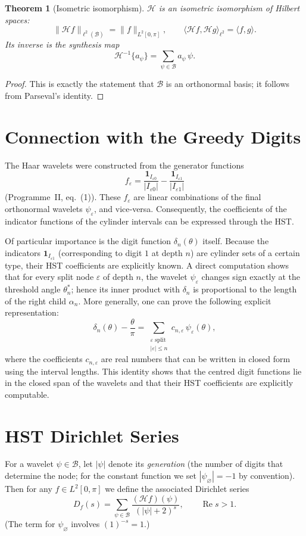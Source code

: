 \documentclass[11pt,a4paper]{article}
\newtheorem{theorem}{Theorem}[section]
\begin{document}
\begin{theorem}[Isometric isomorphism]\label{thm:isometry}
\(\mathcal{H}\) is an isometric isomorphism of Hilbert spaces:
\[
\|\mathcal{H}f\|_{\ell^2(\mathcal{B})} = \|f\|_{L^2[0,\pi]},\qquad
\langle \mathcal{H}f,\mathcal{H}g\rangle_{\ell^2} = \langle f,g\rangle .
\]
Its inverse is the synthesis map
\[
\mathcal{H}^{-1}\{a_\psi\} = \sum_{\psi\in\mathcal{B}} a_\psi\,\psi .
\]
\end{theorem}
\begin{proof}
This is exactly the statement that \(\mathcal{B}\) is an orthonormal basis; it follows from Parseval’s identity.
\end{proof}

\section{Connection with the Greedy Digits}
The Haar wavelets were constructed from the generator functions
\[
f_\varepsilon = \frac{\mathbf{1}_{I_{\varepsilon0}}}{|I_{\varepsilon0}|} - \frac{\mathbf{1}_{I_{\varepsilon1}}}{|I_{\varepsilon1}|}
\]
(Programme~II, eq.~(1)).  These \(f_\varepsilon\) are linear combinations of the final orthonormal wavelets \(\psi_\varepsilon\), and vice‑versa.  Consequently, the coefficients of the indicator functions of the cylinder intervals can be expressed through the HST.

Of particular importance is the digit function \(\delta_n(\theta)\) itself.  Because the indicators \(\mathbf{1}_{I_{\varepsilon1}}\) (corresponding to digit \(1\) at depth \(n\)) are cylinder sets of a certain type, their HST coefficients are explicitly known.  A direct computation shows that for every split node \(\varepsilon\) of depth \(n\), the wavelet \(\psi_\varepsilon\) changes sign exactly at the threshold angle \(\theta_n^*\); hence its inner product with \(\delta_n\) is proportional to the length of the right child \(\alpha_n\).  More generally, one can prove the following explicit representation:
\[
\delta_n(\theta) - \frac{\theta}{\pi} = \sum_{\substack{\varepsilon\text{ split}\\|\varepsilon|\le n}} c_{n,\varepsilon}\,\psi_\varepsilon(\theta),
\]
where the coefficients \(c_{n,\varepsilon}\) are real numbers that can be written in closed form using the interval lengths.  This identity shows that the centred digit functions lie in the closed span of the wavelets and that their HST coefficients are explicitly computable.

\section{HST Dirichlet Series}
For a wavelet \(\psi\in\mathcal{B}\), let \(|\psi|\) denote its \emph{generation} (the number of digits that determine the node; for the constant function we set \(|\psi_\varnothing|=-1\) by convention).  Then for any \(f\in L^2[0,\pi]\) we define the associated Dirichlet series
\begin{equation}\label{eq:Dirichlet}
D_f(s) = \sum_{\psi\in\mathcal{B}} \frac{(\mathcal{H}f)(\psi)}{(|\psi|+2)^s},\qquad \operatorname{Re}s>1.
\end{equation}
(The term for \(\psi_\varnothing\) involves \((1)^{-s}=1\).)
\end{document}
